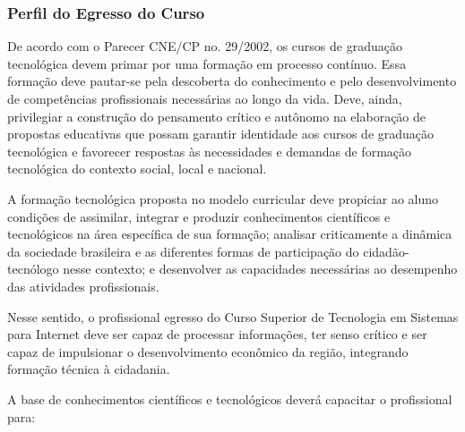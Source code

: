 \subsubsection{Perfil do Egresso do Curso}

De acordo com o Parecer CNE/CP no. 29/2002, os cursos de graduação tecnológica devem primar por uma formação em processo contínuo. Essa formação deve pautar-se pela descoberta do conhecimento e pelo desenvolvimento de competências profissionais necessárias ao longo da vida. Deve, ainda, privilegiar a construção do pensamento crítico e autônomo na elaboração de propostas educativas que possam garantir identidade aos cursos de graduação tecnológica e favorecer respostas às necessidades e demandas de formação tecnológica do contexto social, local e nacional.

A formação tecnológica proposta no modelo curricular deve propiciar ao aluno condições de assimilar, integrar e produzir conhecimentos científicos e tecnológicos na área específica de sua formação; analisar criticamente a dinâmica da sociedade brasileira e as diferentes formas de participação do cidadão-tecnólogo nesse contexto; e desenvolver as capacidades necessárias ao desempenho das atividades profissionais.

Nesse sentido, o profissional egresso do Curso Superior de Tecnologia em Sistemas para Internet deve ser capaz de processar informações, ter senso crítico e ser capaz de impulsionar o desenvolvimento econômico da região, integrando formação técnica à cidadania.

A base de conhecimentos científicos e tecnológicos deverá capacitar o profissional para:

